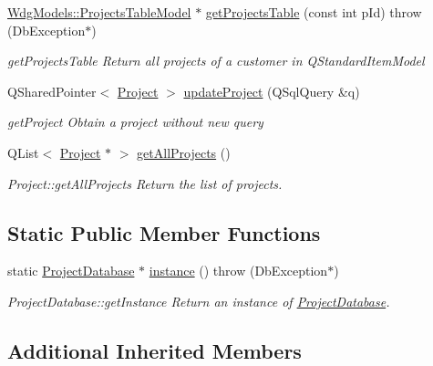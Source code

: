 \begin{DoxyCompactItemize}
\hyperlink{classGui_1_1Widgets_1_1WdgModels_1_1ProjectsTableModel}{Wdg\-Models\-::\-Projects\-Table\-Model} $\ast$ \hyperlink{classDatabases_1_1ProjectDatabase_ac00628f2d8911298dcb0292f6c4cff66}{get\-Projects\-Table} (const int p\-Id)  throw (\-Db\-Exception$\ast$)
\begin{DoxyCompactList}\small\item\em get\-Projects\-Table Return all projects of a customer in Q\-Standard\-Item\-Model \end{DoxyCompactList}\item 
Q\-Shared\-Pointer$<$ \hyperlink{classModels_1_1Project}{Project} $>$ \hyperlink{classDatabases_1_1ProjectDatabase_ab644aeb47d9666e8191cc9bc6ab93417}{update\-Project} (Q\-Sql\-Query \&q)
\begin{DoxyCompactList}\small\item\em get\-Project Obtain a project without new query \end{DoxyCompactList}\item 
Q\-List$<$ \hyperlink{classModels_1_1Project}{Project} $\ast$ $>$ \hyperlink{classDatabases_1_1ProjectDatabase_ac2532676aabcc8f304b2a3ddf4892205}{get\-All\-Projects} ()
\begin{DoxyCompactList}\small\item\em Project\-::get\-All\-Projects Return the list of projects. \end{DoxyCompactList}\end{DoxyCompactItemize}
\subsection*{Static Public Member Functions}
\begin{DoxyCompactItemize}
\item 
static \hyperlink{classDatabases_1_1ProjectDatabase}{Project\-Database} $\ast$ \hyperlink{classDatabases_1_1ProjectDatabase_a75cf81b8d073addcf43a313483dafe65}{instance} ()  throw (\-Db\-Exception$\ast$)
\begin{DoxyCompactList}\small\item\em Project\-Database\-::get\-Instance Return an instance of \hyperlink{classDatabases_1_1ProjectDatabase}{Project\-Database}. \end{DoxyCompactList}\end{DoxyCompactItemize}
\subsection*{Additional Inherited Members}


